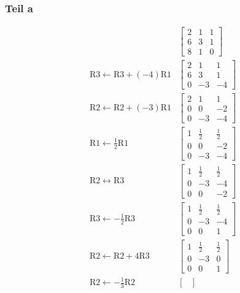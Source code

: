 \documentclass[fleqn,draft,a5paper]{article}
\theoremstyle{remark}
\providecommand{\R}[1]{\mathrm{R#1}}
\begin{document}
\subsubsection{Teil a}
\begin{align*}
  & &\begin{bmatrix}
    2 & 1 & 1 \\
    6 & 3 & 1 \\
    8 & 1 & 0
  \end{bmatrix} \\
  &\R{3} \leftarrow \R{3} + (-4) \R{1} &
  \begin{bmatrix}
    2 & 1 & 1 \\
    6 & 3 & 1 \\
    0 & -3 & -4
  \end{bmatrix} \\
  &\R{2} \leftarrow \R{2} + (-3) \R{1} &
  \begin{bmatrix}
    2 & 1 & 1 \\
    0 & 0 & -2 \\
    0 & -3 & -4
  \end{bmatrix} \\
  &\R{1} \leftarrow \frac12 \R{1} &
  \begin{bmatrix}
    1 & \frac12 & \frac12 \\
    0 & 0 & -2 \\
    0 & -3 & -4
  \end{bmatrix} \\
&  \R{2} \leftrightarrow \R{3} &
  \begin{bmatrix}
    1 & \frac12 & \frac12 \\
    0 & -3 & -4 \\
    0 & 0 & -2
  \end{bmatrix} \\
 & \R{3} \leftarrow -\frac12 \R{3} & 
  \begin{bmatrix}
    1 & \frac12 & \frac12 \\
    0 & -3 & -4 \\
    0 & 0 & 1
  \end{bmatrix} \\
 & \R{2} \leftarrow \R{2} + 4 \R{3} & 
  \begin{bmatrix}
    1 & \frac12 & \frac12 \\
    0 & -3 & 0 \\
    0 & 0 & 1
  \end{bmatrix} \\
 & \R{2} \leftarrow -\frac13 \R{2} & 
  \begin{bmatrix}

\end{bmatrix}
\end{align*}
\end{document}
